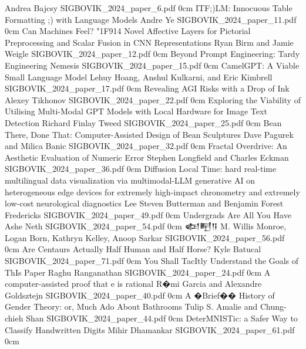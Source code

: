 	{Andrea Bajcsy}
	{}
	{SIGBOVIK_2024_paper_6.pdf}
	{0cm}
	{}
\addpaper
	{ITF;)LM: Innocuous Table Formatting ;) with Language Models}
	{Andre Ye}
	{}
	{SIGBOVIK_2024_paper_11.pdf}
	{0cm}
	{}
\addpaper
	{Can Machines Feel? \char"1F914 Novel Affective Layers for Pictorial Preprocessing and Scalar Fusion in CNN Representations}
	{Ryan Birm and Jamie Weigle}
	{}
	{SIGBOVIK_2024_paper_12.pdf}
	{0cm}
	{}
\addpaper
	{Beyond Prompt Engineering: Tardy Engineering}
	{Nemesis }
	{}
	{SIGBOVIK_2024_paper_15.pdf}
	{0cm}
	{}
\addpaper
	{CamelGPT: A Viable Small Language Model}
	{Lehuy Hoang, Anshul Kulkarni, and Eric Kimbrell}
	{}
	{SIGBOVIK_2024_paper_17.pdf}
	{0cm}
	{}
\addpaper
	{Revealing AGI Risks with a Drop of Ink}
	{Alexey Tikhonov}
	{}
	{SIGBOVIK_2024_paper_22.pdf}
	{0cm}
	{}
\addpaper
	{Exploring the Viability of Utilising Multi-Modal GPT Models with Local Hardware for Image Text Detection}
	{Richard Finlay Tweed}
	{}
	{SIGBOVIK_2024_paper_25.pdf}
	{0cm}
	{}
\addpaper
	{Bean There, Done That: Computer-Assisted Design of Bean Sculptures}
	{Dave Pagurek and Milica Banic}
	{}
	{SIGBOVIK_2024_paper_32.pdf}
	{0cm}
	{}
\addpaper
	{Fractal Overdrive: An Aesthetic Evaluation of Numeric Error}
	{Stephen Longfield and Charles Eckman}
	{}
	{SIGBOVIK_2024_paper_36.pdf}
	{0cm}
	{}
\addpaper
	{Diffusion Local Time: hard real-time multilingual data visualization via multimodal-LLM generative AI on heterogeneous edge devices for extremely high-impact chronometry and extremely low-cost neurological diagnostics}
	{Lee Steven Butterman and Benjamin Forest Fredericks}
	{}
	{SIGBOVIK_2024_paper_49.pdf}
	{0cm}
	{}
\addpaper
	{Undergrads Are All You Have}
	{Ashe Neth}
	{}
	{SIGBOVIK_2024_paper_54.pdf}
	{0cm}
	{}
\addpaper
	{𒅴𒋃𒀀}
	{M. Willis Monroe, Logan Born, Kathryn Kelley, Anoop Sarkar}
	{}
	{SIGBOVIK_2024_paper_56.pdf}
	{0cm}
	{}
\addpaper
	{Are Centaurs Actually Half Human and Half Horse?}
	{Kyle Batucal}
	{}
	{SIGBOVIK_2024_paper_71.pdf}
	{0cm}
	{}
\addpaper
	{You Shall TacItly Understand the Goals of ThIs Paper}
	{Raghu Ranganathan}
	{}
	{SIGBOVIK_2024_paper_24.pdf}
	{0cm}
	{}
\addpaper
	{A computer-assisted proof that e is rational}
	{R�mi Garcia and Alexandre Goldsztejn}
	{}
	{SIGBOVIK_2024_paper_40.pdf}
	{0cm}
	{}
\addpaper
	{A �Brief�� History of Gender Theory: or, Much Ado About Bathrooms}
	{Tulip S. Amalie and Chung-chieh Shan}
	{}
	{SIGBOVIK_2024_paper_44.pdf}
	{0cm}
	{}
\addpaper
	{DeterMNISTic: a Safer Way to Classify Handwritten Digits}
	{Mihir Dhamankar}
	{}
	{SIGBOVIK_2024_paper_61.pdf}
	{0cm}
	{}
\addpaper
